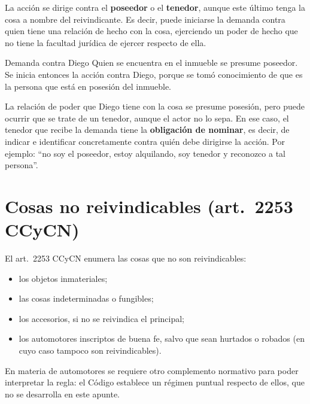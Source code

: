 \documentclass[12pt,oneside]{book}
\begin{document}
La acción se dirige contra el \textbf{poseedor} o el \textbf{tenedor}, aunque este último tenga la cosa a nombre del reivindicante. Es decir, puede iniciarse la demanda contra quien tiene una relación de hecho con la cosa, ejerciendo un poder de hecho que no tiene la facultad jurídica de ejercer respecto de ella.

\begin{example}{Demanda contra Diego}
Quien se encuentra en el inmueble se presume poseedor. Se inicia entonces la acción contra Diego, porque se tomó conocimiento de que es la persona que está en posesión del inmueble.
\end{example}

La relación de poder que Diego tiene con la cosa se presume posesión, pero puede ocurrir que se trate de un tenedor, aunque el actor no lo sepa. En ese caso, el tenedor que recibe la demanda tiene la \textbf{obligación de nominar}, es decir, de indicar e identificar concretamente contra quién debe dirigirse la acción. Por ejemplo: ``no soy el poseedor, estoy alquilando, soy tenedor y reconozco a tal persona''.

\section{Cosas no reivindicables (art.\ 2253 CCyCN)}

El art.\ 2253 CCyCN enumera las cosas que no son reivindicables:

\begin{itemize}
    \item los objetos inmateriales;
    \item las cosas indeterminadas o fungibles;
    \item los accesorios, si no se reivindica el principal;
    \item los automotores inscriptos de buena fe, salvo que sean hurtados o robados (en cuyo caso tampoco son reivindicables).
\end{itemize}


\begin{note}
En materia de automotores se requiere otro complemento normativo para poder interpretar la regla: el Código establece un régimen puntual respecto de ellos, que no se desarrolla en este apunte.
\end{note}
\end{document}
